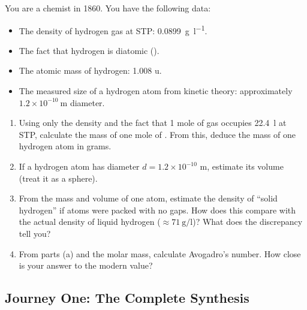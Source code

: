 \documentclass[12pt, a4paper]{book}
\theoremstyle{definition}
\begin{document}
\begin{deepbox}
\begin{enumerate}[label=\textbf{D\arabic*.}]
        You are a chemist in 1860.
        You have the following data:
        \begin{itemize}[nosep, leftmargin=2em]
          \item The density of hydrogen gas at STP:
                \SI{0.0899}{\gram\per\litre}.
          \item The fact that hydrogen is diatomic ().
          \item The atomic mass of hydrogen: 1.008 u.
          \item The measured size of a hydrogen atom from
                kinetic theory: approximately
                $1.2 \times 10^{-10}\ \si{\metre}$ diameter.
        \end{itemize}

        \begin{enumerate}[label=(\alph*)]
          \item Using only the density and the fact that
                1 mole of gas occupies \SI{22.4}{\litre} at STP,
                calculate the mass of one mole of .
                From this, deduce the mass of one hydrogen atom in grams.

          \item If a hydrogen atom has diameter
                $d = 1.2\times10^{-10}$ m,
                estimate its volume (treat it as a sphere).

          \item From the mass and volume of one atom,
                estimate the density of ``solid hydrogen''
                if atoms were packed with no gaps.
                How does this compare with the actual density
                of liquid hydrogen ($\approx \SI{71}{\gram\per\litre}$)?
                What does the discrepancy tell you?

          \item From parts (a) and the molar mass,
                calculate Avogadro's number.
                How close is your answer to the modern value?
        \end{enumerate}

\end{enumerate}
\end{deepbox}

\subsection*{Journey One: The Complete Synthesis}
\end{document}
